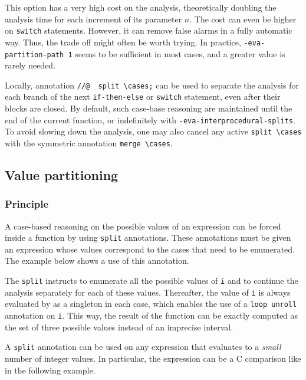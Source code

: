 \documentclass{frama-c-book}
\begin{document}
This option has a very high cost on the analysis, theoretically doubling the
analysis time for each increment of its parameter $n$.
The cost can even be higher on \lstinline|switch| statements.
However, it can remove false alarms in a fully automatic way. Thus,
the trade off might often be worth trying.
In practice, \lstinline|-eva-partition-path 1| seems to be sufficient in
most cases, and a greater value is rarely needed.

Locally, annotation \lstinline|//@  split \cases;| can be used to separate the
analysis for each branch of the next \lstinline|if-then-else| or
\lstinline|switch| statement, even after their blocks are closed.
By default, such case-base reasoning are maintained until the end of the current
function, or indefinitely with \lstinline|-eva-interprocedural-splits|.
To avoid slowing down the analysis, one may also cancel any active
\lstinline|split \cases| with the symmetric annotation \lstinline|merge \cases|.

\subsection{Value partitioning}
\label{value-partitioning}

\subsubsection{Principle}

A case-based reasoning on the possible values of an expression can be forced
inside a function by using \lstinline|split| annotations.  These annotations
must be given an expression whose values correspond to the cases that need to be
enumerated. The example below shows a use of this annotation.


The \lstinline|split| instructs \Eva{} to enumerate all the possible
values of \lstinline|i| and to continue the analysis separately for
each of these values. Thereafter, the value of \lstinline|i| is always
evaluated by \Eva{} as a singleton in each case, which enables the use of a
\lstinline|loop unroll| annotation on \lstinline|i|. This way, the result of
the function can be exactly computed as the set of three possible values instead
of an imprecise interval.


A \lstinline|split| annotation can be used on any expression that evaluates to a
{\it small} number of integer values. In particular, the expression can be a C
comparison like in the following example.
\end{document}
